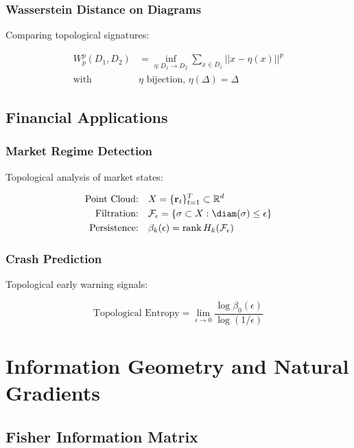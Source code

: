 \documentclass[11pt,letterpaper,openany]{book}
\newcommand{\R}{\mathbb{R}}
\newcommand{\rank}{\operatorname{rank}}
\begin{document}
\subsubsection{Wasserstein Distance on Diagrams}

Comparing topological signatures:

\begin{align}
W_p^p(D_1, D_2) &= \inf_{\eta: D_1 \to D_2} \sum_{x \in D_1} ||x - \eta(x)||^p \\
\text{with} \quad & \eta \text{ bijection, } \eta(\Delta) = \Delta
\end{align}

\subsection{Financial Applications}

\subsubsection{Market Regime Detection}

Topological analysis of market states:

\begin{align}
\text{Point Cloud:} \quad & X = \{\mathbf{r}_t\}_{t=1}^T \subset \R^d \\
\text{Filtration:} \quad & \mathcal{F}_\epsilon = \{ \sigma \subset X : \diam(\sigma) \leq \epsilon \} \\
\text{Persistence:} \quad & \beta_k(\epsilon) = \rank H_k(\mathcal{F}_\epsilon)
\end{align}

\subsubsection{Crash Prediction}

Topological early warning signals:

\[
\text{Topological Entropy} = \lim_{\epsilon \to 0} \frac{\log \beta_0(\epsilon)}{\log(1/\epsilon)}
\]

\section{Information Geometry and Natural Gradients}

\subsection{Fisher Information Matrix}
\end{document}
